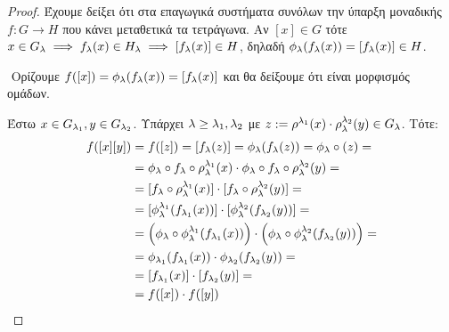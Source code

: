 \begin{proof}
    Έχουμε δείξει ότι στα επαγωγικά συστήματα συνόλων την ύπαρξη μοναδικής $f : G\longrightarrow H$ που κάνει μεταθετικά τα τετράγωνα. Αν $[x] \in G$ τότε $x \in G_{\lambda}\implies f_{\lambda}(x) \in H_{\lambda} \implies [f_{\lambda}(x)] \in H$, δηλαδή $\phi_{\lambda}(f_{\lambda}(x)) =[f_{\lambda}(x)] \in H$.

    $ $\newline
    Ορίζουμε $f([x]) = \phi_{\lambda}(f_{\lambda}(x)) = [f_{\lambda}(x)]$ και θα δείξουμε ότι είναι μορφισμός ομάδων.

    \begin{figure}[H]
        \centering
    \end{figure}

    Έστω $x \in G_{\lambda_1}, y \in G_{\lambda_2}$. Υπάρχει $\lambda \geq \lambda_1,\lambda_2$ με $z:=\rho^{\lambda_1}(x) \cdot \rho^{\lambda_2}_{\lambda}(y) \in G_{\lambda}$. Τότε:
    \begin{align*}
        f([x][y]) &= f([z]) = [f_{\lambda}(z)] = \phi_{\lambda}(f_{\lambda}(z)) = \phi_{\lambda} \circ (z) = \\
         &= \phi_{\lambda} \circ f_{\lambda} \circ \rho^{\lambda_1}_{\lambda}(x) \cdot \phi_{\lambda} \circ f_{\lambda} \circ \rho^{\lambda_2}_{\lambda}(y) = \\
         &= [f_{\lambda} \circ \rho^{\lambda_1}_{\lambda}(x)] \cdot [f_{\lambda} \circ \rho^{\lambda_2}_{\lambda}(y)] = \\
         &= [\phi^{\lambda_1}_{\lambda}(f_{\lambda_1}(x))]\cdot [\phi^{\lambda_2}_{\lambda}(f_{\lambda_2}(y))] = \\
         &= \left(\phi_{\lambda}\circ \phi^{\lambda_1}_{\lambda} (f_{\lambda_1}(x))\right) \cdot \left(\phi_{\lambda}\circ \phi^{\lambda_2}_{\lambda} (f_{\lambda_2}(y))\right) = \\
         &= \phi_{\lambda_1}(f_{\lambda_1}(x)) \cdot \phi_{\lambda_2}(f_{\lambda_2}(y)) = \\
         &= [f_{\lambda_1}(x)]\cdot [f_{\lambda_2}(y)] = \\
         &= f([x])\cdot f([y])
    \end{align*}

\end{proof}

